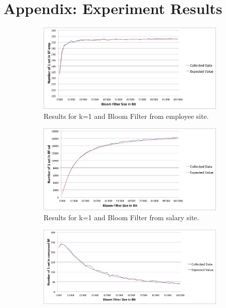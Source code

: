 \documentclass[12]{scrartcl}
\begin{document}
\section{Appendix: Experiment Results}
\begin{figure}[H]
	\begin{subfigure}[t]{\textwidth}
		\begin{center}
			\includegraphics[scale=0.3]{res/1-emp.png}
		\end{center}
		\caption{Results for k=1 and Bloom Filter from employee site.}
	\end{subfigure}
	\begin{subfigure}[t]{\textwidth}
		\begin{center}
			\includegraphics[scale=0.3]{res/1-sal.png}
		\end{center}
		\caption{Results for k=1 and Bloom Filter from salary site.}
	\end{subfigure}
	\begin{subfigure}[t]{\textwidth}
		\begin{center}
			\includegraphics[scale=0.3]{res/1-composed.png}

\end{center}
\end{subfigure}
\end{figure}
\end{document}
